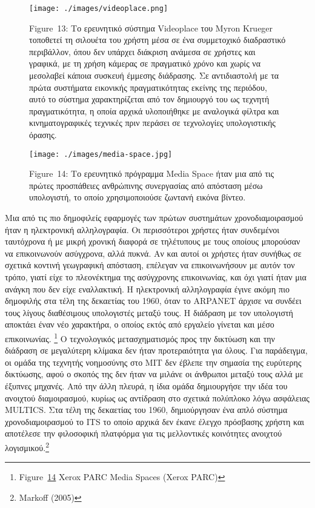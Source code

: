 \documentclass[
]{article}
\begin{document}
\leavevmode{}%
\begin{figure}
\hypertarget{fig:videoplace}{%
\centering
\texttt{[image: ./images/videoplace.png]}
\caption{Figure~13: Το ερευνητικό σύστημα Videoplace του Myron Krueger
τοποθετεί τη σιλουέτα του χρήστη μέσα σε ένα συμμετοχικό διαδραστικό
περιβάλλον, όπου δεν υπάρχει διάκριση ανάμεσα σε χρήστες και γραφικά, με
τη χρήση κάμερας σε πραγματικό χρόνο και χωρίς να μεσολαβεί κάποια
συσκευή έμμεσης διάδρασης. Σε αντιδιαστολή με τα πρώτα συστήματα
εικονικής πραγματικότητας εκείνης της περιόδου, αυτό το σύστημα
χαρακτηρίζεται από τον δημιουργό του ως τεχνητή πραγματικότητα, η οποία
αρχικά υλοποιήθηκε με αναλογικά φίλτρα και κινηματογραφικές τεχνικές
πριν περάσει σε τεχνολογίες υπολογιστικής όρασης.}\label{fig:videoplace}
}
\end{figure}

\leavevmode{}%
\begin{figure}
\hypertarget{fig:media-space}{%
\centering
\texttt{[image: ./images/media-space.jpg]}
\caption{Figure~14: Το ερευνητικό πρόγραμμα Media Space ήταν μια από τις
πρώτες προσπάθειες ανθρώπινης συνεργασίας από απόσταση μέσω υπολογιστή,
το οποίο χρησιμοποιούσε ζωντανή εικόνα βίντεο.}\label{fig:media-space}
}
\end{figure}

Μια από τις πιο δημοφιλείς εφαρμογές των πρώτων συστημάτων
χρονοδιαμοιρασμού ήταν η ηλεκτρονική αλληλογραφία. Οι περισσότεροι
χρήστες ήταν συνδεμένοι ταυτόχρονα ή με μικρή χρονική διαφορά σε
τηλέτυπους με τους οποίους μπορούσαν να επικοινωνούν ασύγχρονα, αλλά
πυκνά. Αν και αυτοί οι χρήστες ήταν συνήθως σε σχετικά κοντινή
γεωγραφική απόσταση, επέλεγαν να επικοινωνήσουν με αυτόν τον τρόπο,
γιατί είχε το πλεονέκτημα της ασύγχρονης επικοινωνίας, και όχι γιατί
ήταν μια ανάγκη που δεν είχε εναλλακτική. Η ηλεκτρονική αλληλογραφία
έγινε ακόμη πιο δημοφιλής στα τέλη της δεκαετίας του 1960, όταν το
ARPANET άρχισε να συνδέει τους λίγους διαθέσιμους υπολογιστές μεταξύ
τους. Η διάδραση με τον υπολογιστή αποκτάει έναν νέο χαρακτήρα, ο οποίος
εκτός από εργαλείο γίνεται και μέσο επικοινωνίας. \footnote{Figure~\protect\hyperlink{fig:media-space}{14}
  Xerox PARC Media Spaces (Xerox PARC)} Ο τεχνολογικός μετασχηματισμός
προς την δικτύωση και την διάδραση σε μεγαλύτερη κλίμακα δεν ήταν
προτεραιότητα για όλους. Για παράδειγμα, οι ομάδα της τεχνητής
νοημοσύνης στο ΜΙΤ δεν έβλεπε την σημασία της ευρύτερης δικτύωσης, αφού
ο σκοπός της δεν ήταν να μιλάνε οι άνθρωποι μεταξύ τους αλλά με έξυπνες
μηχανές. Από την άλλη πλευρά, η ίδια ομάδα δημιουργήσε την ιδέα του
ανοιχτού διαμοιρασμού, κυρίως ως αντίδραση στο σχετικά πολύπλοκο λόγω
ασφάλειας MULTICS. Στα τέλη της δεκαετίας του 1960, δημιούργησαν ένα
απλό σύστημα χρονοδιαμοιρασμού το ITS το οποίο αρχικά δεν έκανε έλεγχο
πρόσβασης χρήστη και αποτέλεσε την φιλοσοφική πλατφόρμα για τις
μελλοντικές κοινότητες ανοιχτού λογισμικού.\footnote{Markoff (2005)}
\end{document}
